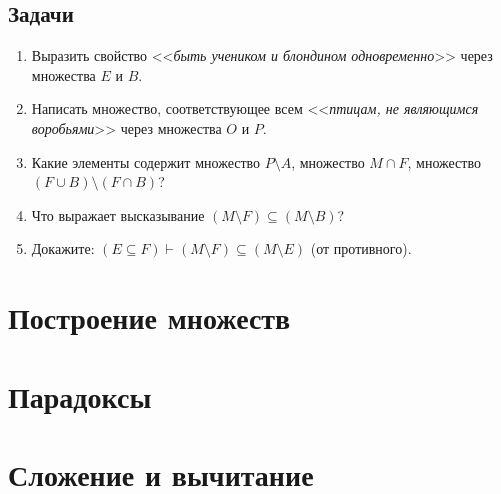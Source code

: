 \subsection{Задачи}
\begin{enumerate}
\item Выразить свойство <<\textit{быть учеником и блондином одновременно}>> через множества $E$ и $B$.
\item Написать множество, соответствующее всем <<\textit{птицам, не являющимся воробьями}>> через множества $O$ и $P$.
\item Какие элементы содержит множество $P\setminus A$, множество $M\cap F$, множество $(F\cup B)\setminus (F\cap B)$?
\item Что выражает высказывание $(M\setminus F)\subseteq (M\setminus B)$?
\item Докажите: $(E\subseteq F)\vdash (M\setminus F)\subseteq (M\setminus E)$ (от противного).
\end{enumerate}


\section{Построение множеств}


\section{Парадоксы}







\section{Сложение и вычитание}

